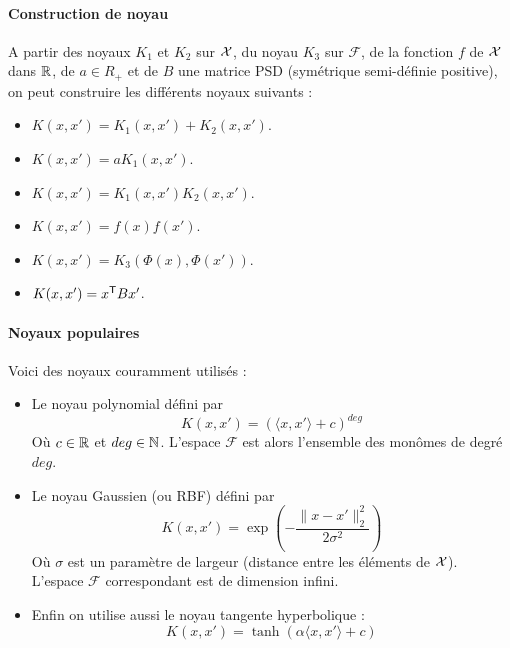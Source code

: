 
\paragraph{Construction de noyau}
A partir des noyaux $K_1$ et $K_2$ sur $\mathcal{X}$, du noyau $K_3$ sur $\mathcal{F}$, de la fonction $f$ de $\mathcal{X}$ dans $\mathbb{R}$, de $a \in R_+$ et de $B$ une matrice PSD (symétrique semi-définie positive), on peut construire les différents noyaux suivants :
\begin{itemize}
	\item $K(x, x') = K_1(x, x') + K_2(x, x')$.
	\item $K(x, x') = a K_1(x, x')$.
	\item $K(x, x') = K_1(x, x') K_2(x, x')$.
	\item $K(x, x') = f(x) f(x')$.
	\item $K(x, x') = K_3(\Phi(x), \Phi(x'))$.
	\item $K(x, x') = x^{\mathsf{T}} B x'$.
\end{itemize}

\paragraph{Noyaux populaires}
Voici des noyaux couramment utilisés :
\begin{itemize}
	\item Le noyau polynomial défini par
	$$ K(x, x') = \left( \langle x, x' \rangle + c \right)^{deg} $$
	Où $c \in \mathbb{R}$ et $deg \in \mathbb{N}$. L'espace $\mathcal{F}$ est alors l'ensemble des monômes de degré $deg$.
	\item Le noyau Gaussien (ou RBF) défini par
	$$ K(x, x') = \exp \left( - \dfrac{\|x - x'\|_2^2}{2 \sigma^2} \right) $$
	Où $\sigma$ est un paramètre de largeur (distance entre les éléments de $\mathcal{X}$). L'espace $\mathcal{F}$ correspondant est de dimension infini.
	\item Enfin on utilise aussi le noyau tangente hyperbolique :
	$$ K(x, x') = \tanh \left( \alpha \langle x, x' \rangle + c \right) $$
\end{itemize}


